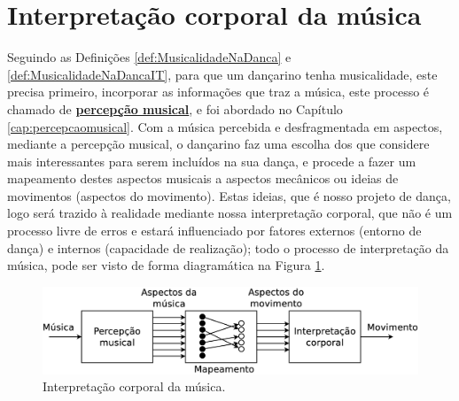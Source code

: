 \section{Interpretação corporal da música}
\label{sec:interpretacioncorporal}

Seguindo as Definições \ref{def:MusicalidadeNaDanca} e \ref{def:MusicalidadeNaDancaIT},
para que um dançarino tenha musicalidade, este precisa primeiro,
incorporar as  informações que traz a música,  
este processo é chamado de \hyperref[cap:percepcaomusical]{\textbf{percepção musical}}, 
e foi abordado no Capítulo \ref{cap:percepcaomusical}.
Com a música percebida e desfragmentada em aspectos, mediante a percepção musical,
o dançarino faz uma escolha dos que considere mais interessantes para serem incluídos na sua dança,
e procede a fazer um mapeamento destes aspectos musicais
a aspectos mecânicos ou ideias de movimentos (aspectos do movimento).
Estas ideias, que é nosso projeto de dança, logo será trazido à realidade mediante nossa interpretação corporal,
que não é um processo livre de erros e estará influenciado por fatores externos (entorno de dança) e 
internos (capacidade de realização);
todo o processo de interpretação da música, 
pode ser visto de forma diagramática na Figura \ref{fig:interpretacion-corporal}.
\begin{figure}[!h]
  \centering
    \includegraphics[width=1.00\textwidth]{chapters/cap-musicalidade/interpretacion-corporal.eps}
\caption{Interpretação corporal da música.}
\label{fig:interpretacion-corporal}
\end{figure}

